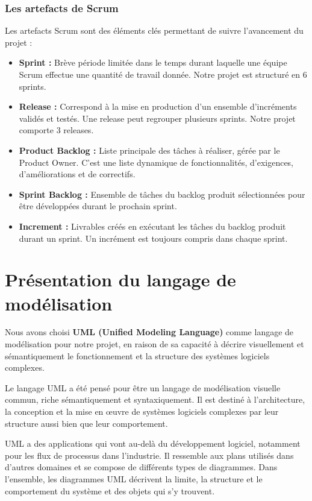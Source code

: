 \subsubsection{Les artefacts de Scrum}
Les artefacts Scrum sont des éléments clés permettant de suivre l'avancement du projet :

\begin{itemize}
    \item \textbf{Sprint :} Brève période limitée dans le temps durant laquelle une équipe Scrum effectue une quantité de travail donnée. Notre projet est structuré en 6 sprints.

    \item \textbf{Release :} Correspond à la mise en production d'un ensemble d'incréments validés et testés. Une release peut regrouper plusieurs sprints. Notre projet comporte 3 releases.

    \item \textbf{Product Backlog :} Liste principale des tâches à réaliser, gérée par le Product Owner. C'est une liste dynamique de fonctionnalités, d'exigences, d'améliorations et de correctifs.

    \item \textbf{Sprint Backlog :} Ensemble de tâches du backlog produit sélectionnées pour être développées durant le prochain sprint.

    \item \textbf{Increment :} Livrables créés en exécutant les tâches du backlog produit durant un sprint. Un incrément est toujours compris dans chaque sprint.
\end{itemize}

\section{Présentation du langage de modélisation}
Nous avons choisi \textbf{UML (Unified Modeling Language)} comme langage de modélisation pour notre projet, en raison de sa capacité à décrire visuellement et sémantiquement le fonctionnement et la structure des systèmes logiciels complexes.

Le langage UML a été pensé pour être un langage de modélisation visuelle commun, riche sémantiquement et syntaxiquement. Il est destiné à l'architecture, la conception et la mise en œuvre de systèmes logiciels complexes par leur structure aussi bien que leur comportement.

UML a des applications qui vont au-delà du développement logiciel, notamment pour les flux de processus dans l'industrie. Il ressemble aux plans utilisés dans d'autres domaines et se compose de différents types de diagrammes. Dans l'ensemble, les diagrammes UML décrivent la limite, la structure et le comportement du système et des objets qui s'y trouvent.


